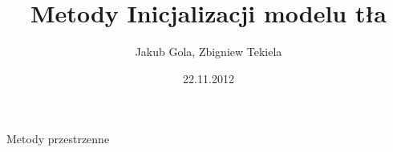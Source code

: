 \documentclass{beamer}
\title[Inicjalizacja tła]{Metody Inicjalizacji modelu tła}
\author[J.Gola, Z.Tekiela]{Jakub Gola, Zbigniew Tekiela }
\date[2012]{22.11.2012}
\institute[AGH-UST]
{Wydział EAIiIB\\ 
Informatyka Stosowana
}
\begin{document}
{
 \begin{frame}
   \titlepage
 \end{frame}
}

\begin{frame}
\begin{center}
\Huge{Metody przestrzenne}
\end{center}


\end{frame}

\end{document}
